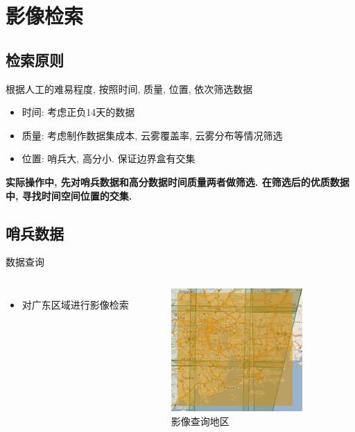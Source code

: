 \section{影像检索}
\subsection{检索原则}
\begin{frame}
    根据人工的难易程度, 按照时间, 质量, 位置, 依次筛选数据
    \begin{itemize}
        \item 时间: 考虑正负14天的数据
        \item 质量: 考虑制作数据集成本, 云雾覆盖率, 云雾分布等情况筛选
        \item 位置: 哨兵大, 高分小. 保证边界盒有交集
    \end{itemize}
    
    \textbf{实际操作中, 先对哨兵数据和高分数据时间质量两者做筛选. 在筛选后的优质数据中, 寻找时间空间位置的交集.}
\end{frame}

\subsection{哨兵数据}
\begin{frame}{数据查询}
    \begin{columns}
        \begin{itemize}
            \item \small{对广东区域进行影像检索}
        \end{itemize}

        \begin{figure}
            \centering
            \includegraphics[width=5cm]{pic/pic0101.jpg}
            \caption{影像查询地区}
            \label{fig:0101}
        \end{figure}
    \end{columns}
\end{frame}

